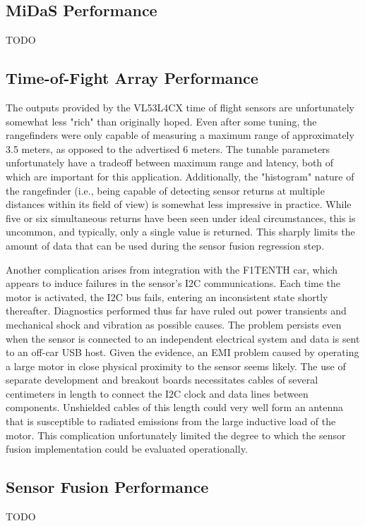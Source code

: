 \documentclass[conference]{IEEEtran}
\begin{document}
\subsection{MiDaS Performance}
TODO

\subsection{Time-of-Fight Array Performance}
The outputs provided by the VL53L4CX time of flight sensors are unfortunately
somewhat less "rich" than originally hoped. Even after some tuning, the
rangefinders were only capable of measuring a maximum range of approximately
3.5 meters, as opposed to the advertised 6 meters. The tunable parameters
unfortunately have a tradeoff between maximum range and latency, both of which
are important for this application. Additionally, the "histogram" nature of the
rangefinder (i.e., being capable of detecting sensor returns at multiple
distances within its field of view) is somewhat less impressive in practice.
While five or six simultaneous returns have been seen under ideal
circumstances, this is uncommon, and typically, only a single value is
returned. This sharply limits the amount of data that can be used during the
sensor fusion regression step.

Another complication arises from integration with the F1TENTH car, which
appears to induce failures in the sensor's I2C communications. Each time the
motor is activated, the I2C bus fails, entering an inconsistent state shortly
thereafter. Diagnostics performed thus far have ruled out power transients and
mechanical shock and vibration as possible causes. The problem persists even
when the sensor is connected to an independent electrical system and data is
sent to an off-car USB host. Given the evidence, an EMI problem caused by
operating a large motor in close physical proximity to the sensor seems likely.
The use of separate development and breakout boards necessitates cables of
several centimeters in length to connect the I2C clock and data lines between
components. Unshielded cables of this length could very well form an antenna
that is susceptible to radiated emissions from the large inductive load of the
motor. This complication unfortunately limited the degree to which the sensor
fusion implementation could be evaluated operationally.

\subsection{Sensor Fusion Performance}
TODO
\end{document}

